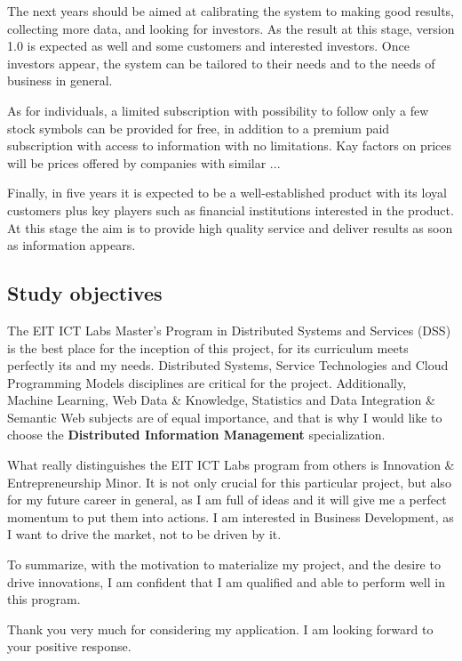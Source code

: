 \documentclass[a4paper,12pt]{article}
\begin{document}
The next years should be aimed at calibrating the system to making good results, collecting more data, and looking for investors. As the result at this stage, version 1.0 is expected as well and some customers and interested investors. Once investors appear, the system can be tailored to their needs and to the needs of business in general.

As for individuals, a limited subscription with possibility to follow only a few stock symbols can be provided for free, in addition to a premium paid subscription with access to information with no limitations. Kay factors on prices will be prices offered by companies with similar ... 

Finally, in five years it is expected to be a well-established product with its loyal customers plus key players such as financial institutions interested in the product. At this stage the aim is to provide high quality service and deliver results as soon as information appears.

\subsection*{Study objectives}

The EIT ICT Labs Master's Program in Distributed Systems and Services (DSS) is the best place for the inception of this project, for its curriculum meets perfectly its and my needs. Distributed Systems, Service Technologies and Cloud Programming Models disciplines are critical for the project. Additionally, Machine Learning, Web Data \& Knowledge, Statistics and Data Integration \& Semantic Web subjects are of equal importance, and that is why I would like to choose the \textbf{Distributed Information Management} specialization. 

What really distinguishes the EIT ICT Labs program from others is Innovation \& Entrepreneurship Minor. It is not only crucial for this particular project, but also for my future career in general, as I am full of ideas and it will give me a perfect momentum to put them into actions. I am interested in Business Development, as I want to drive the market, not to be driven by it. 

To summarize, with the motivation to materialize my project, and the desire to drive innovations, I am confident that I am qualified and able to perform well in this program.

Thank you very much for considering my application. I am looking forward to your positive response.
\end{document}

